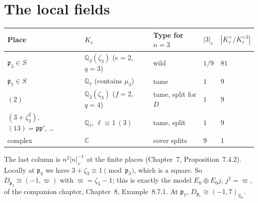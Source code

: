 \documentclass[11pt]{article}
\newcommand{\Q}{\mathbb Q}
\newcommand{\C}{\mathbb C}
\newcommand{\p}{\mathfrak p}
\theoremstyle{definition}
\begin{document}
\section{The local fields}
\begin{center}
\begin{tabular}{@{}lllll@{}}
\toprule
Place & $K_v$ & Type for $n=3$ & $|3|_v$ & $|K_v^\times/K_v^{\times3}|$\\\midrule
$\p_3\in S$ & $\Q_3(\zeta_3)$ ($e=2$, $q=3$) & wild & $1/9$ & $81$\\
$\p_7\in S$ & $\Q_7$ (contains $\mu_3$) & tame & $1$ & $9$\\
$(2)$ & $\Q_2(\zeta_3)$ ($f=2$, $q=4$) & tame, split for $D$ & $1$ & $9$\\
$(3+\zeta_3^2)$, $(13)=\p\p'$, \ldots & $\Q_\ell$, $\ell\equiv1\ (3)$ & tame, split & $1$ & $9$\\
complex & $\C$ & cover splits & $9$ & $1$\\
\bottomrule
\end{tabular}
\end{center}
The last column is $n^2|n|_v^{-1}$ at the finite places (Chapter~7,
Proposition~7.4.2). Locally at $\p_3$ we have $3+\zeta_3\equiv1\pmod{\p_3}$,
which is a square. So $D_{\p_3}\cong(-1,\varpi)$ with
$\varpi=\zeta_3-1$; this is exactly the model $E_0\oplus E_0j$, $j^2=\varpi$,
of the companion chapter, Chapter~8, Example~8.7.1. At $\p_7$, $D_{\p_7}\cong(-1,7)_{\Q_7}$.
\end{document}

